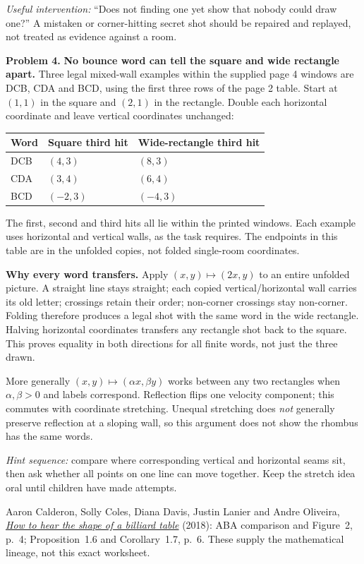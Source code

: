 \documentclass[11pt,letterpaper]{article}
\newcommand{\sectiontitle}[1]{\par\vspace{4pt}{\large\bfseries #1}\par}
\newcommand{\answer}[1]{\par\vspace{3pt}\textbf{Problem #1.} }
\begin{document}
\textit{Useful intervention:} ``Does not finding one yet show that nobody could draw one?'' A mistaken or corner-hitting secret shot should be repaired and replayed, not treated as evidence against a room.

\answer{4} \textbf{No bounce word can tell the square and wide rectangle apart.} Three legal mixed-wall examples within the supplied page 4 windows are DCB, CDA and BCD, using the first three rows of the page 2 table. Start at $(1,1)$ in the square and $(2,1)$ in the rectangle. Double each horizontal coordinate and leave vertical coordinates unchanged:
\begin{center}\renewcommand{\arraystretch}{1.25}
\begin{tabular}{@{}lll@{}}
Word & Square third hit & Wide-rectangle third hit\\\hline
DCB & $(4,3)$ & $(8,3)$\\
CDA & $(3,4)$ & $(6,4)$\\
BCD & $(-2,3)$ & $(-4,3)$
\end{tabular}\end{center}
The first, second and third hits all lie within the printed windows. Each example uses horizontal and vertical walls, as the task requires. The endpoints in this table are in the unfolded copies, not folded single-room coordinates.

\textbf{Why every word transfers.} Apply $(x,y)\mapsto(2x,y)$ to an entire unfolded picture. A straight line stays straight; each copied vertical/horizontal wall carries its old letter; crossings retain their order; non-corner crossings stay non-corner. Folding therefore produces a legal shot with the same word in the wide rectangle. Halving horizontal coordinates transfers any rectangle shot back to the square. This proves equality in both directions for all finite words, not just the three drawn.

More generally $(x,y)\mapsto(\alpha x,\beta y)$ works between any two rectangles when $\alpha,\beta>0$ and labels correspond. Reflection flips one velocity component; this commutes with coordinate stretching. Unequal stretching does \emph{not} generally preserve reflection at a sloping wall, so this argument does not show the rhombus has the same words.

\textit{Hint sequence:} compare where corresponding vertical and horizontal seams sit, then ask whether all points on one line can move together. Keep the stretch idea oral until children have made attempts.

\sectiontitle{Sources, checks, and limits}
Aaron Calderon, Solly Coles, Diana Davis, Justin Lanier and Andre Oliveira, \href{https://justinlanier.org/wp-content/uploads/2020/10/bounce.pdf}{\emph{How to hear the shape of a billiard table}} (2018): ABA comparison and Figure~2, p.~4; Proposition~1.6 and Corollary~1.7, p.~6. These supply the mathematical lineage, not this exact worksheet.
\end{document}
